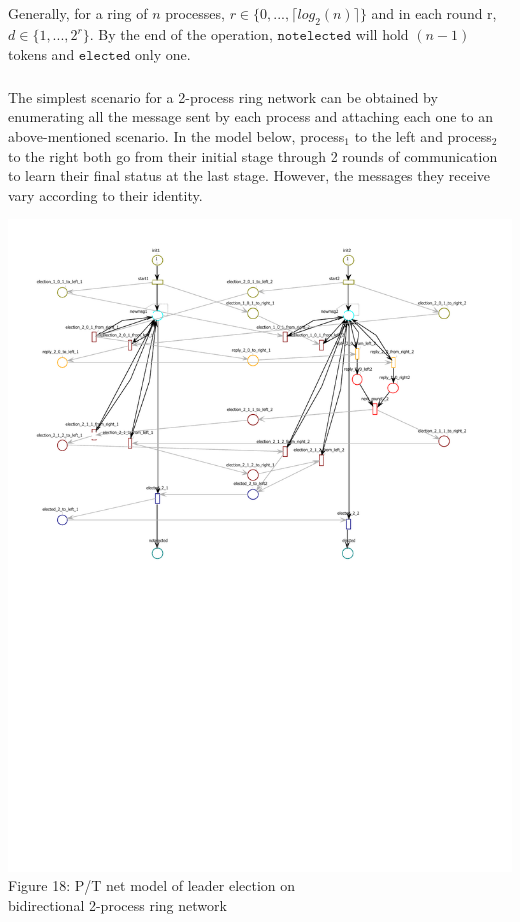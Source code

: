 \documentclass{article}
\begin{document}
\newpage
	\subparagraph{}Generally, for a ring of $n$ processes, $r\in \{0,...,\lceil log_2(n) \rceil \}$ and in each round r, $d\in \{1,...,2^r\}$. By the end of the operation,  $\mathtt{notelected}$ will hold $(n-1)$ tokens and $\mathtt{elected}$ only one. 
	\subparagraph{}The simplest scenario for a 2-process ring network can be obtained by enumerating all the message sent by each process and attaching each one to an above-mentioned scenario. In the model below, process$_1$ to the left and process$_2$ to the right both go from their initial stage through 2 rounds of communication to learn their final status at the last stage. However, the messages they receive vary according to their identity.
	\begin{center}
		\vspace*{-50pt}
		\hspace*{-100pt}
		\includegraphics[scale=0.9,trim=0 370 0 30,clip]{ring2_abs}
		\\Figure 18: P/T net model of leader election on\\ bidirectional 2-process ring network
	\end{center}
\end{document}
